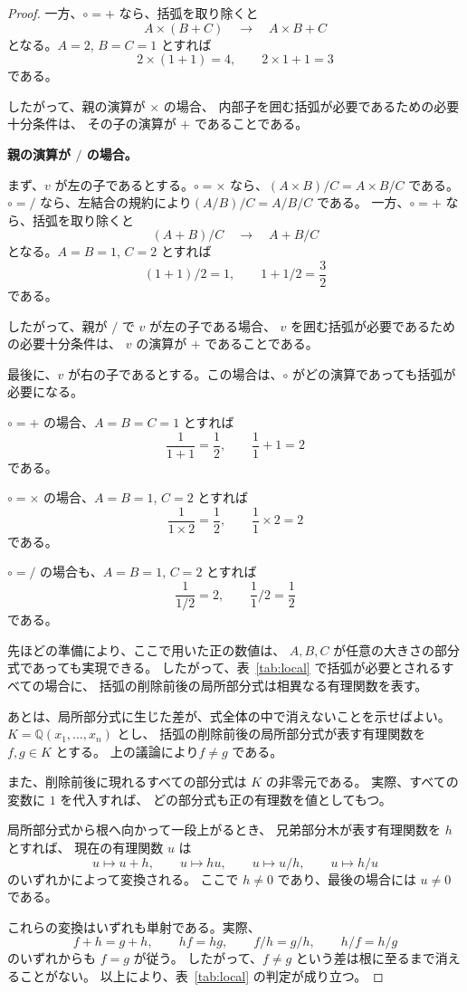 \documentclass[11pt]{ltjsarticle}
\newcommand{\Q}{\mathbb{Q}}
\begin{document}
\begin{proof}
一方、$\circ=+$ なら、括弧を取り除くと
\[
A\times(B+C)
\quad\longrightarrow\quad
A\times B+C
\]
となる。$A=2$, $B=C=1$ とすれば
\[
2\times(1+1)=4,
\qquad
2\times1+1=3
\]
である。

したがって、親の演算が $\times$ の場合、
内部子を囲む括弧が必要であるための必要十分条件は、
その子の演算が $+$ であることである。

\medskip
\noindent
\textbf{親の演算が $/$ の場合。}

まず、$v$ が左の子であるとする。$\circ=\times$ なら、$(A\times B)/C=A\times B/C$
である。
$\circ=/$ なら、左結合の規約により$(A/B)/C=A/B/C$
である。
一方、$\circ=+$ なら、括弧を取り除くと
\[
(A+B)/C
\quad\longrightarrow\quad
A+B/C
\]
となる。$A=B=1$, $C=2$ とすれば
\[
(1+1)/2=1,
\qquad
1+1/2=\frac32
\]
である。

したがって、親が $/$ で $v$ が左の子である場合、
$v$ を囲む括弧が必要であるための必要十分条件は、
$v$ の演算が $+$ であることである。

最後に、$v$ が右の子であるとする。この場合は、$\circ$ がどの演算であっても括弧が必要になる。

$\circ=+$ の場合、$A=B=C=1$ とすれば
\[
\frac{1}{1+1}=\frac12,
\qquad
\frac11+1=2
\]
である。

$\circ=\times$ の場合、$A=B=1$, $C=2$ とすれば
\[
\frac{1}{1\times2}=\frac12,
\qquad
\frac11\times2=2
\]
である。

$\circ=/$ の場合も、$A=B=1$, $C=2$ とすれば
\[
\frac{1}{1/2}=2,
\qquad
\frac11/2=\frac12
\]
である。

先ほどの準備により、ここで用いた正の数値は、
$A,B,C$ が任意の大きさの部分式であっても実現できる。
したがって、表~\ref{tab:local} で括弧が必要とされるすべての場合に、
括弧の削除前後の局所部分式は相異なる有理関数を表す。

あとは、局所部分式に生じた差が、式全体の中で消えないことを示せばよい。
$K=\Q(x_1,\ldots,x_n)$ とし、
括弧の削除前後の局所部分式が表す有理関数を $f,g\in K$ とする。
上の議論により$f\ne g$
である。

また、削除前後に現れるすべての部分式は $K$ の非零元である。
実際、すべての変数に $1$ を代入すれば、
どの部分式も正の有理数を値としてもつ。

局所部分式から根へ向かって一段上がるとき、
兄弟部分木が表す有理関数を $h$ とすれば、
現在の有理関数 $u$ は
\[
u\longmapsto u+h,\qquad
u\longmapsto hu,\qquad
u\longmapsto u/h,\qquad
u\longmapsto h/u
\]
のいずれかによって変換される。
ここで $h\ne0$ であり、最後の場合には $u\ne0$ である。

これらの変換はいずれも単射である。実際、
\[
f+h=g+h,\qquad
hf=hg,\qquad
f/h=g/h,\qquad
h/f=h/g
\]
のいずれからも $f=g$ が従う。
したがって、$f\ne g$ という差は根に至るまで消えることがない。
以上により、表~\ref{tab:local} の判定が成り立つ。
\end{proof}
\end{document}
